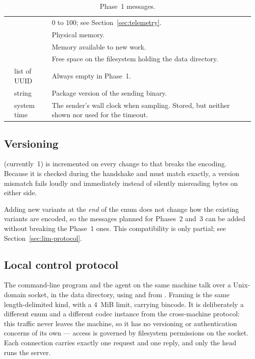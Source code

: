 \documentclass{article}
\begin{document}
\begin{table}[htbp]
\begin{tabular}{L{0.25\textwidth}L{0.13\textwidth}L{0.5\textwidth}}
     & 
      & 0 to 100; see Section~\ref{sec:telemetry}. \\
     &  & Physical memory. \\
     &  & Memory available to new work. \\
     & 
      & Free space on the filesystem holding the data directory. \\
     & list of UUID & Always empty in Phase~1. \\
     & string
      & Package version of the sending binary. \\
     & system time
      & The sender's wall clock when sampling. Stored, but neither shown
        nor used for the timeout. \\
    \hline
  \end{tabular}
  \caption{Phase~1 messages.}
  \label{tab:messages}
\end{table}

\subsection{Versioning}

 (currently~1) is incremented on every change to
 that breaks the encoding. Because it is checked during the
handshake and must match exactly, a version mismatch fails loudly and
immediately instead of silently misreading bytes on either side.

Adding new variants at the \emph{end} of the enum does not change how the
existing variants are encoded, so the messages planned for Phases~2
and~3 can be added without breaking the Phase~1 ones. This compatibility
is only partial; see Section~\ref{sec:lim-protocol}.

\subsection{Local control protocol}

The command-line program and the agent on the same machine talk over a
Unix-domain socket,  in the data directory, using
 and  from . Framing
is the same length-delimited kind, with a 4~MiB limit, carrying bincode.
It is deliberately a different enum and a different codec instance from
the cross-machine protocol: this traffic never leaves the machine, so it
has no versioning or authentication concerns of its own --- access is
governed by filesystem permissions on the socket. Each connection carries
exactly one request and one reply, and only the head runs the server.
\end{document}
